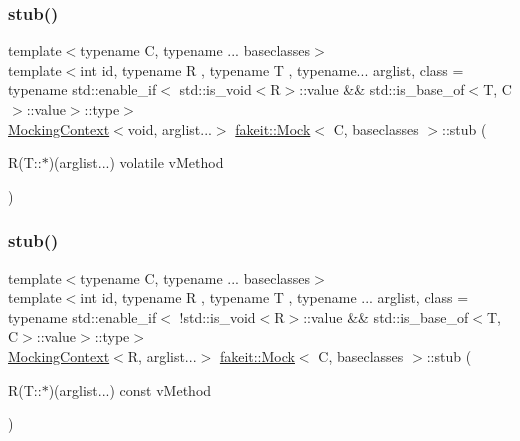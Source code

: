 \mbox{\label{classfakeit_1_1Mock_a8bb1a9ff231e91407f6dea872e2c4a4f}} 
\subsubsection{\texorpdfstring{stub()}{stub()}\hspace{0.1cm}{\footnotesize\ttfamily [24/72]}}
{\footnotesize\ttfamily template$<$typename C, typename ... baseclasses$>$ \\
template$<$int id, typename R , typename T , typename... arglist, class  = typename std\+::enable\+\_\+if$<$                std\+::is\+\_\+void$<$\+R$>$\+::value \&\& std\+::is\+\_\+base\+\_\+of$<$\+T, C$>$\+::value$>$\+::type$>$ \\
\mbox{\hyperlink{classfakeit_1_1MockingContext}{Mocking\+Context}}$<$void, arglist...$>$ \mbox{\hyperlink{classfakeit_1_1Mock}{fakeit\+::\+Mock}}$<$ C, baseclasses $>$\+::stub (\begin{DoxyParamCaption}\item[{R(T\+::$\ast$)(arglist...) volatile}]{v\+Method }\end{DoxyParamCaption})\hspace{0.3cm}{\ttfamily [inline]}}

\mbox{\label{classfakeit_1_1Mock_a7a8f38b58b068b35f263eee42d75c162}} 
\subsubsection{\texorpdfstring{stub()}{stub()}\hspace{0.1cm}{\footnotesize\ttfamily [25/72]}}
{\footnotesize\ttfamily template$<$typename C, typename ... baseclasses$>$ \\
template$<$int id, typename R , typename T , typename ... arglist, class  = typename std\+::enable\+\_\+if$<$                !std\+::is\+\_\+void$<$\+R$>$\+::value \&\& std\+::is\+\_\+base\+\_\+of$<$\+T, C$>$\+::value$>$\+::type$>$ \\
\mbox{\hyperlink{classfakeit_1_1MockingContext}{Mocking\+Context}}$<$R, arglist...$>$ \mbox{\hyperlink{classfakeit_1_1Mock}{fakeit\+::\+Mock}}$<$ C, baseclasses $>$\+::stub (\begin{DoxyParamCaption}\item[{R(T\+::$\ast$)(arglist...) const}]{v\+Method }\end{DoxyParamCaption})\hspace{0.3cm}{\ttfamily [inline]}}

